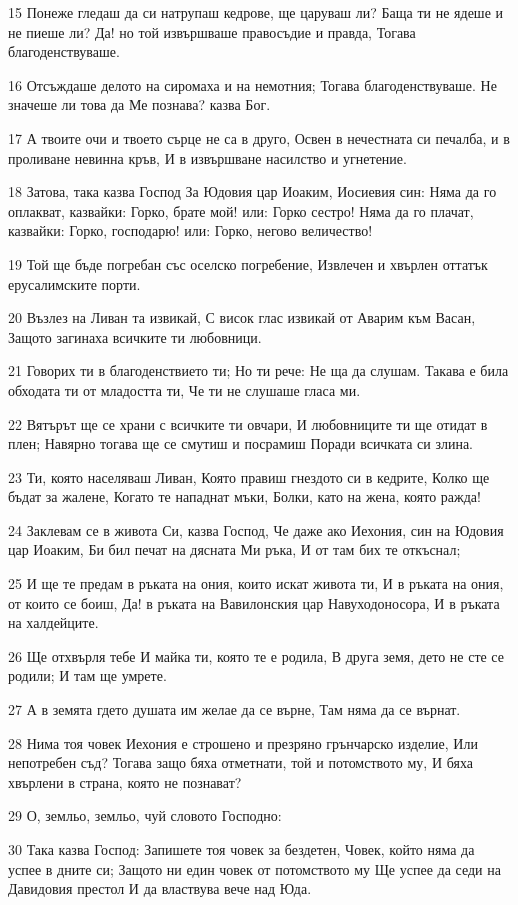 \par 15 Понеже гледаш да си натрупаш кедрове, ще царуваш ли? Баща ти не ядеше и не пиеше ли? Да! но той извършваше правосъдие и правда, Тогава благоденствуваше.
\par 16 Отсъждаше делото на сиромаха и на немотния; Тогава благоденствуваше. Не значеше ли това да Ме познава? казва Бог.
\par 17 А твоите очи и твоето сърце не са в друго, Освен в нечестната си печалба, и в проливане невинна кръв, И в извършване насилство и угнетение.
\par 18 Затова, така казва Господ За Юдовия цар Иоаким, Иосиевия син: Няма да го оплакват, казвайки: Горко, брате мой! или: Горко сестро! Няма да го плачат, казвайки: Горко, господарю! или: Горко, негово величество!
\par 19 Той ще бъде погребан със оселско погребение, Извлечен и хвърлен оттатък ерусалимските порти.
\par 20 Възлез на Ливан та извикай, С висок глас извикай от Аварим към Васан, Защото загинаха всичките ти любовници.
\par 21 Говорих ти в благоденствието ти; Но ти рече: Не ща да слушам. Такава е била обходата ти от младостта ти, Че ти не слушаше гласа ми.
\par 22 Вятърът ще се храни с всичките ти овчари, И любовниците ти ще отидат в плен; Навярно тогава ще се смутиш и посрамиш Поради всичката си злина.
\par 23 Ти, която населяваш Ливан, Която правиш гнездото си в кедрите, Колко ще бъдат за жалене, Когато те нападнат мъки, Болки, като на жена, която ражда!
\par 24 Заклевам се в живота Си, казва Господ, Че даже ако Иехония, син на Юдовия цар Иоаким, Би бил печат на дясната Ми ръка, И от там бих те откъснал;
\par 25 И ще те предам в ръката на ония, които искат живота ти, И в ръката на ония, от които се боиш, Да! в ръката на Вавилонския цар Навуходоносора, И в ръката на халдейците.
\par 26 Ще отхвърля тебе И майка ти, която те е родила, В друга земя, дето не сте се родили; И там ще умрете.
\par 27 А в земята гдето душата им желае да се върне, Там няма да се върнат.
\par 28 Нима тоя човек Иехония е строшено и презряно грънчарско изделие, Или непотребен съд? Тогава защо бяха отметнати, той и потомството му, И бяха хвърлени в страна, която не познават?
\par 29 О, земльо, земльо, чуй словото Господно:
\par 30 Така казва Господ: Запишете тоя човек за бездетен, Човек, който няма да успее в дните си; Защото ни един човек от потомството му Ще успее да седи на Давидовия престол И да властвува вече над Юда.

